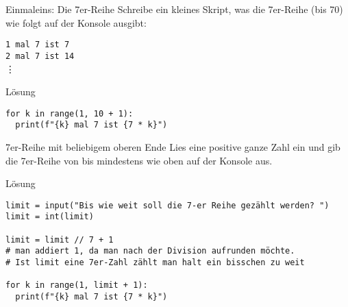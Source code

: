 \begin{fragile}[Übung]

\begin{block}{Einmaleins: Die 7er-Reihe}
	\vspace{2pt}
Schreibe ein kleines Skript, was die 7er-Reihe (bis 70) wie folgt auf der Konsole ausgibt: 

\texttt{1 mal 7 ist 7}\\	
\texttt{2 mal 7 ist 14}\\
\phantom{4 mal} \vdots  
\end{block}

\vspace{12pt}

\begin{solutionblock}{Lösung}
\begin{verbatim}
for k in range(1, 10 + 1):
  print(f"{k} mal 7 ist {7 * k}")
\end{verbatim}
\end{solutionblock}

\end{fragile}



\begin{fragile}[Übung]


\begin{block}{7er-Reihe mit beliebigem oberen Ende}
\vspace{2pt}
Lies eine positive ganze Zahl  ein und gib die 7er-Reihe von  bis mindestens  wie oben auf der Konsole aus.
\end{block}

\vspace{12pt}
\begin{solutionblock}{Lösung}
\begin{verbatim}
limit = input("Bis wie weit soll die 7-er Reihe gezählt werden? ")
limit = int(limit)

limit = limit // 7 + 1
# man addiert 1, da man nach der Division aufrunden möchte.
# Ist limit eine 7er-Zahl zählt man halt ein bisschen zu weit

for k in range(1, limit + 1):
  print(f"{k} mal 7 ist {7 * k}")
\end{verbatim}
\end{solutionblock}


\end{fragile}

